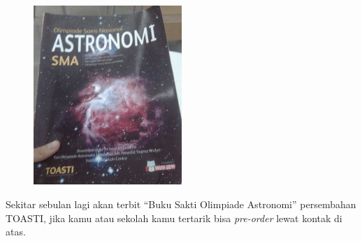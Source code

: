 \documentclass[11pt,fleqn, a4paper]{exam}
\begin{document}
\begin{figure}[H]
\centering
\includegraphics[width=0.5\textwidth]{gambar/buku_toasti.png}
\end{figure}
\begin{flushleft}
Sekitar sebulan lagi akan terbit ``Buku Sakti Olimpiade Astronomi'' persembahan TOASTI, jika kamu atau sekolah kamu tertarik bisa \textit{pre-order} lewat kontak di atas. 
\end{flushleft}
\end{document}
